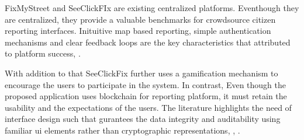 

FixMyStreet and SeeClickFIx are existing centralized platforms. Eventhough they are centralized, they provide a valuable benchmarks for crowdsource citizen reporting interfaces. Inituitive map based reporting, simple authentication mechanisms and clear feedback loops are the key characteristics that attributed to platform success\cite{king2012fixmystreet}, \cite{mysociety2026fixmystreet}.

With addition to that SeeClickFix further uses a gamification mechanism to encourage the users to participate in the system. In contrast, Even though the proposed application uses blockchain for reporting platform, it must retain the usability and the expectations of the users. The literature highlights the need of interface design such that gurantees the data integrity and auditability using familiar ui elements rather than cryptographic representations\cite{adeyeye2025blockchain}, \cite {marian2025transparent}, \cite{nikonenko2025blockchain}.  



